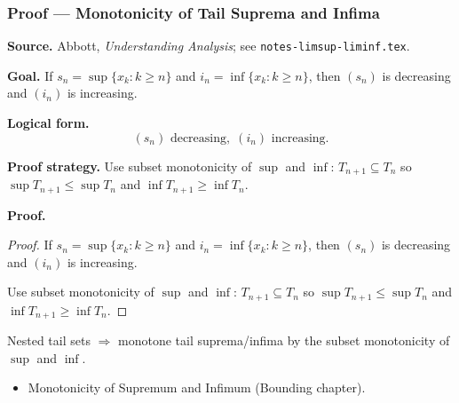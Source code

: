 
\clearpage
{}
\hypertarget{proof-RA-ABB-T-tail-sup-inf-monotone}{}

\subsubsection[Monotonicity of Tail Suprema and Infima]{Proof --- Monotonicity of Tail Suprema and Infima}

\bigskip

\noindent
\textbf{Source.}
Abbott, \emph{Understanding Analysis}; see \texttt{notes-limsup-liminf.tex}.

\vspace{0.75em}

\noindent
\textbf{Goal.}
If $s_n = \sup\{x_k : k \ge n\}$ and $i_n = \inf\{x_k : k \ge n\}$, then $(s_n)$ is decreasing and $(i_n)$ is increasing.

\vspace{0.75em}

\noindent
\textbf{Logical form.}
\[
  (s_n) \text{ decreasing},\; (i_n) \text{ increasing}.
\]

\vspace{0.75em}

\noindent
\textbf{Proof strategy.}
Use subset monotonicity of $\sup$ and $\inf$: $T_{n+1} \subseteq T_n$ so $\sup T_{n+1} \le \sup T_n$ and $\inf T_{n+1} \ge \inf T_n$.

\vspace{0.75em}

\noindent
\textbf{Proof.}
\begin{proof}
\Claim If $s_n = \sup\{x_k : k \ge n\}$ and $i_n = \inf\{x_k : k \ge n\}$, then $(s_n)$ is decreasing and $(i_n)$ is increasing.

\Given 

\Goal 

\Strategy Use subset monotonicity of $\sup$ and $\inf$: $T_{n+1} \subseteq T_n$ so $\sup T_{n+1} \le \sup T_n$ and $\inf T_{n+1} \ge \inf T_n$.

\medskip


\end{proof}

\begin{remark*}
Nested tail sets $\Rightarrow$ monotone tail suprema/infima by the subset monotonicity of $\sup$ and $\inf$.
\end{remark*}

\begin{remark*}[Dependencies]
\begin{itemize}
  \item Monotonicity of Supremum and Infimum (Bounding chapter).
\end{itemize}
\end{remark*}
